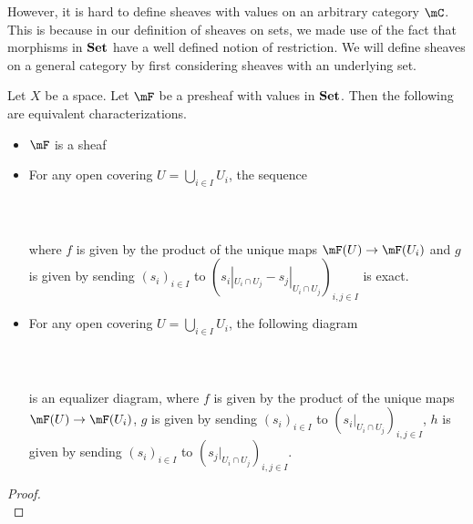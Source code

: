 \documentclass[a4paper]{article}
\begin{document}
However, it is hard to define sheaves with values on an arbitrary category $\mC$. This is because in our definition of sheaves on sets, we made use of the fact that morphisms in $\bold{Set}$ have a well defined notion of restriction. We will define sheaves on a general category by first considering sheaves with an underlying set. 

\begin{thm}{}{} Let $X$ be a space. Let $\mF$ be a presheaf with values in $\bold{Set}$. Then the following are equivalent characterizations. 
\begin{itemize}
\item $\mF$ is a sheaf
\item For any open covering $U=\bigcup_{i\in I}U_i$, the sequence \\~\\
\\~\\
where $f$ is given by the product of the unique maps $\mF(U)\to\mF(U_i)$ and $g$ is given by sending $(s_i)_{i\in I}$ to $(s_i|_{U_i\cap U_j}-s_j|_{U_i\cap U_j})_{i,j\in I}$ is exact. 
\item For any open covering $U=\bigcup_{i\in I}U_i$, the following diagram \\~\\
\\~\\
is an equalizer diagram, where $f$ is given by the product of the unique maps $\mF(U)\to\mF(U_i)$, $g$ is given by sending $(s_i)_{i\in I}$ to $(s_i|_{U_i\cap U_j})_{i,j\in I}$, $h$ is given by sending $(s_i)_{i\in I}$ to $(s_j|_{U_i\cap U_j})_{i,j\in I}$. 
\end{itemize} \tcbline
\begin{proof}~\\

\end{proof}
\end{thm}
\end{document}
